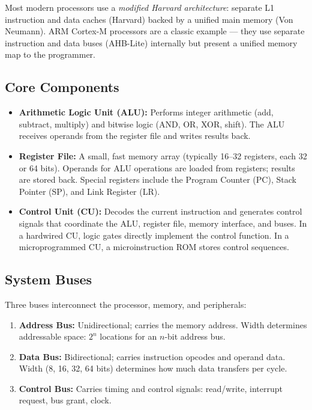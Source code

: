 \begin{insight}
Most modern processors use a \emph{modified Harvard architecture}: separate L1 instruction and data caches (Harvard) backed by a unified main memory (Von Neumann). ARM Cortex-M processors are a classic example --- they use separate instruction and data buses (AHB-Lite) internally but present a unified memory map to the programmer.
\end{insight}

\subsection{Core Components}

\begin{itemize}
  \item \textbf{Arithmetic Logic Unit (ALU):} Performs integer arithmetic (add, subtract, multiply) and bitwise logic (AND, OR, XOR, shift). The ALU receives operands from the register file and writes results back.
  \item \textbf{Register File:} A small, fast memory array (typically 16--32 registers, each 32 or 64 bits). Operands for ALU operations are loaded from registers; results are stored back. Special registers include the Program Counter (PC), Stack Pointer (SP), and Link Register (LR).
  \item \textbf{Control Unit (CU):} Decodes the current instruction and generates control signals that coordinate the ALU, register file, memory interface, and buses. In a hardwired CU, logic gates directly implement the control function. In a microprogrammed CU, a microinstruction ROM stores control sequences.
\end{itemize}

\subsection{System Buses}

Three buses interconnect the processor, memory, and peripherals:
\begin{enumerate}
  \item \textbf{Address Bus:} Unidirectional; carries the memory address. Width determines addressable space: $2^n$ locations for an $n$-bit address bus.
  \item \textbf{Data Bus:} Bidirectional; carries instruction opcodes and operand data. Width (8, 16, 32, 64 bits) determines how much data transfers per cycle.
  \item \textbf{Control Bus:} Carries timing and control signals: read/write, interrupt request, bus grant, clock.
\end{enumerate}

